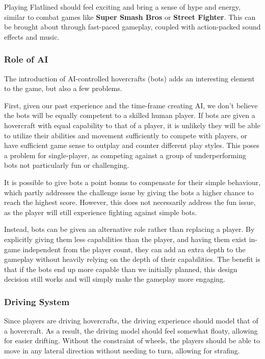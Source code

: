 \documentclass{article}
\newcommand{\name}{Flatlined}
\theoremstyle{definition}
\begin{document}
Playing \name{} should feel exciting and bring a sense of hype and energy,
similar to combat games like \textbf{Super Smash Bros} or \textbf{Street
Fighter}. This can be brought about through fast-paced gameplay, coupled with
action-packed sound effects and music.

\subsubsection{Role of AI}

The introduction of AI-controlled hovercrafts (bots) adds an interesting
element to the game, but also a few problems.

First, given our past experience and the time-frame creating AI, we don't
believe the bots will be equally competent to a skilled human player. If bots
are given a hovercraft with equal capability to that of a player, it is
unlikely they will be able to utilize their abilities and movement sufficiently
to compete with players, or have sufficient game sense to outplay and counter
different play styles. This poses a problem for single-player, as competing
against a group of underperforming bots not particularly fun or challenging.

It is possible to give bots a point bonus to compensate for their simple
behaviour, which partly addresses the challenge issue by giving the bots
a higher chance to reach the highest score. However, this does not necessarily
address the fun issue, as the player will still experience fighting against
simple bots.

Instead, bots can be given an alternative role rather than replacing a player.
By explicitly giving them less capabilities than the player, and having them
exist in-game independent from the player count, they can add an extra depth to
the gameplay without heavily relying on the depth of their capabilities. The
benefit is that if the bots end up more capable than we initially planned, this
design decision still works and will simply make the gameplay more engaging.


\subsubsection{Driving System}

Since players are driving hovercrafts, the driving experience should model
that of a hovercraft. As a result, the driving model should feel somewhat
floaty, allowing for easier drifting. Without the constraint of wheels, the
players should be able to move in any lateral direction without needing to
turn, allowing for strafing.
\end{document}
